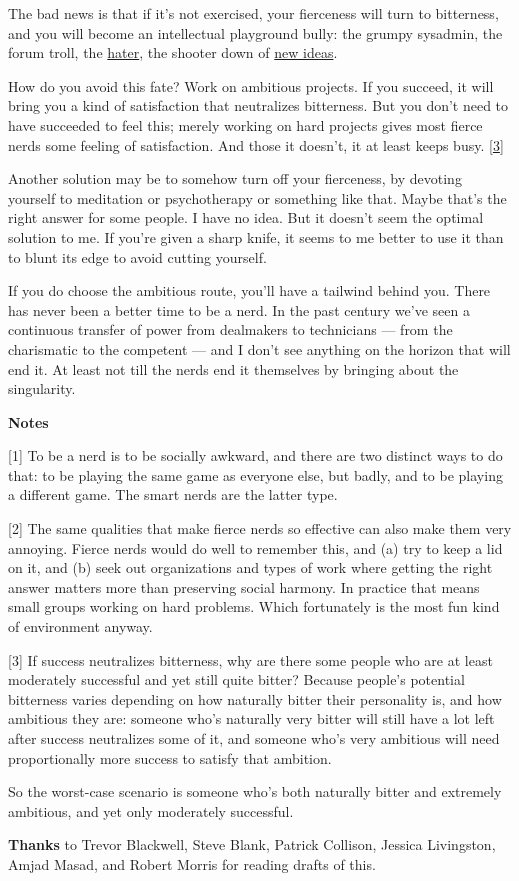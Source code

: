 The bad news is that if it's not exercised, your fierceness will turn to
bitterness, and you will become an intellectual playground bully: the
grumpy sysadmin, the forum troll, the \href{fh.html}{hater}, the shooter
down of \href{newideas.html}{new ideas}.

How do you avoid this fate? Work on ambitious projects. If you succeed,
it will bring you a kind of satisfaction that neutralizes bitterness.
But you don't need to have succeeded to feel this; merely working on
hard projects gives most fierce nerds some feeling of satisfaction. And
those it doesn't, it at least keeps busy. {[}\hyperref[f3n]{3}{]}

Another solution may be to somehow turn off your fierceness, by devoting
yourself to meditation or psychotherapy or something like that. Maybe
that's the right answer for some people. I have no idea. But it doesn't
seem the optimal solution to me. If you're given a sharp knife, it seems
to me better to use it than to blunt its edge to avoid cutting yourself.

If you do choose the ambitious route, you'll have a tailwind behind you.
There has never been a better time to be a nerd. In the past century
we've seen a continuous transfer of power from dealmakers to technicians
--- from the charismatic to the competent --- and I don't see anything
on the horizon that will end it. At least not till the nerds end it
themselves by bringing about the singularity.

\textbf{Notes}

{[}1{]} To be a nerd is to be socially awkward, and there are two
distinct ways to do that: to be playing the same game as everyone else,
but badly, and to be playing a different game. The smart nerds are the
latter type.

{[}2{]} The same qualities that make fierce nerds so effective can also
make them very annoying. Fierce nerds would do well to remember this,
and (a) try to keep a lid on it, and (b) seek out organizations and
types of work where getting the right answer matters more than
preserving social harmony. In practice that means small groups working
on hard problems. Which fortunately is the most fun kind of environment
anyway.

{[}3{]} If success neutralizes bitterness, why are there some people who
are at least moderately successful and yet still quite bitter? Because
people's potential bitterness varies depending on how naturally bitter
their personality is, and how ambitious they are: someone who's
naturally very bitter will still have a lot left after success
neutralizes some of it, and someone who's very ambitious will need
proportionally more success to satisfy that ambition.

So the worst-case scenario is someone who's both naturally bitter and
extremely ambitious, and yet only moderately successful.

\textbf{Thanks} to Trevor Blackwell, Steve Blank, Patrick Collison,
Jessica Livingston, Amjad Masad, and Robert Morris for reading drafts of
this.
